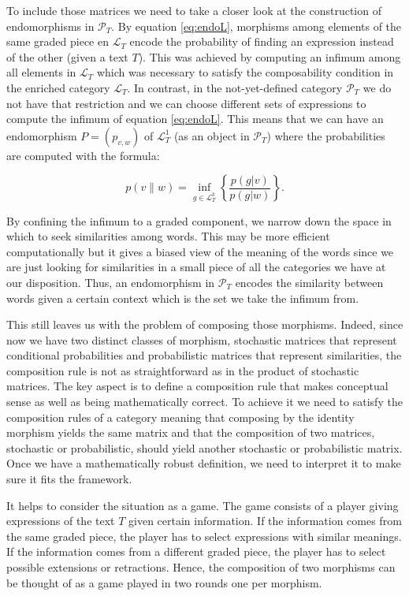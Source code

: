 \documentclass[10pt,a4paper]{elsarticle}
\renewcommand{\L}{\mathcal{L}}
\renewcommand{\P}{\mathcal{P}}
\begin{document}
To include those matrices we need to take a closer look at the construction of endomorphisms in $\P_{T}$. By equation \eqref{eq:endoL}, morphisms among elements of the same graded piece en $\L_{T}$ encode the probability of finding an expression instead of the other (given a text $T$). This was achieved by computing an infimum among all elements in $\L_{T}$ which was necessary to satisfy the composability condition in the enriched category $\L_{T}$. In contrast, in the not-yet-defined category $\P_{T}$ we do not have that restriction and we can choose different sets of expressions to compute the infimum of equation \eqref{eq:endoL}. This means that we can have an endomorphism $P = (p_{v,w})$ of $\L_{T}^{1}$ (as an object in $\P_{T}$) where the probabilities are computed with the formula:

\begin{equation}
	p(v\| w) = \inf_{g\in \L_{T}^{k}}\left\{\frac{p(g| v)}{p(g| w)}	\right\}.
\end{equation}

By confining the infimum to a graded component, we narrow down the space in which to seek similarities among words. This may be more efficient computationally but it gives a biased view of the meaning of the words since we are just looking for similarities in a small piece of all the categories we have at our disposition. Thus, an endomorphism in $\P_{T}$ encodes the similarity between words given a certain context which is the set we take the infimum from. 

This still leaves us with the problem of composing those morphisms. Indeed, since now we have two distinct classes of morphism, stochastic matrices that represent conditional probabilities and probabilistic matrices that represent similarities, the composition rule is not as straightforward as in the product of stochastic matrices. The key aspect is to define a composition rule that makes conceptual sense as well as being mathematically correct. To achieve it we need to satisfy the composition rules of a category meaning that composing by the identity morphism yields the same matrix and that the composition of two matrices, stochastic or probabilistic, should yield another stochastic or probabilistic matrix. Once we have a mathematically robust definition, we need to interpret it to make sure it fits the framework.

It helps to consider the situation as a game. The game consists of a player giving expressions of the text $T$ given certain information. If the information comes from the same graded piece, the player has to select expressions with similar meanings. If the information comes from a different graded piece, the player has to select possible extensions or retractions. Hence, the composition of two morphisms can be thought of as a game played in two rounds one per morphism.
\end{document}
